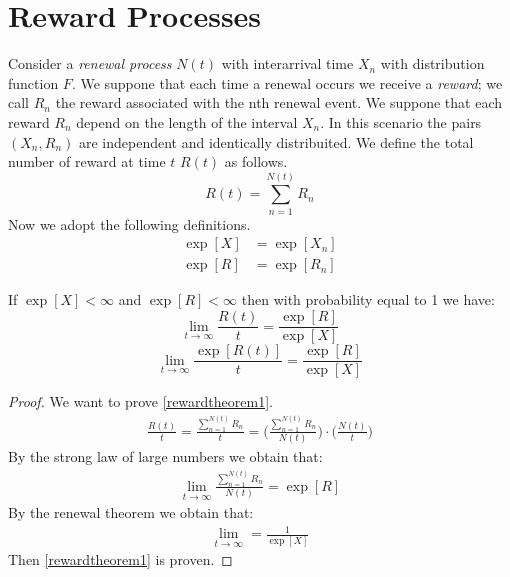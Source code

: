 \section{Reward Processes}

Consider a \textit{renewal process} $N(t)$ with interarrival time $X_n$ with distribution function $F$. We suppone that each time a renewal occurs we receive a \textit{reward}; we call $R_n$ the reward associated with the nth renewal event. We suppone that each reward $R_n$ depend on the length of the interval $X_n$. In this scenario the pairs $(X_n, R_n)$ are independent and identically distribuited. We define the total number of reward at time $t$ $R(t)$ as follows.
\begin{equation}
	R(t)=\sum_{n=1}^{N(t)}R_n
\end{equation}
Now we adopt the following definitions.
\begin{align*}
	\exp[X] & =\exp[X_n]
	\\ \exp[R] & =\exp[R_n]
\end{align*}
\begin{theorem}
  If $\exp[X]<\infty$ and $\exp[R]<\infty$ then with probability equal to 1 we have:
	\begin{equation}
		\lim_{t \to \infty}\frac{R(t)}{t}=\frac{\exp[R]}{\exp[X]}
		\label{rewardtheorem1}
	\end{equation}
	\begin{equation}
		\lim_{t \to \infty}\frac{\exp[R(t)]}{t}=\frac{\exp[R]}{\exp[X]}
		\label{rewardtheorem2}
	\end{equation}
\end{theorem}
\begin{proof}
	We want to prove \ref{rewardtheorem1}.
	\begin{align*}
		\frac{R(t)}{t}=\frac{\sum_{n=1}^{N(t)}R_n}{t}= \bigg( \frac{\sum_{n=1}^{N(t)}R_n}{N(t)}\bigg)\cdot\bigg(\frac{N(t)}{t}\bigg)
	\end{align*}
	By the strong law of large numbers we obtain that:
	\begin{align*}
		\lim_{t \to \infty}\frac{\sum_{n=1}^{N(t)}R_n}{N(t)}=\exp[R]
	\end{align*}
	By the renewal theorem we obtain that:
	\begin{align*}
		\lim_{t \to \infty}=\frac{1}{\exp[X]}
	\end{align*}
	Then \ref{rewardtheorem1} is proven.
\end{proof}
